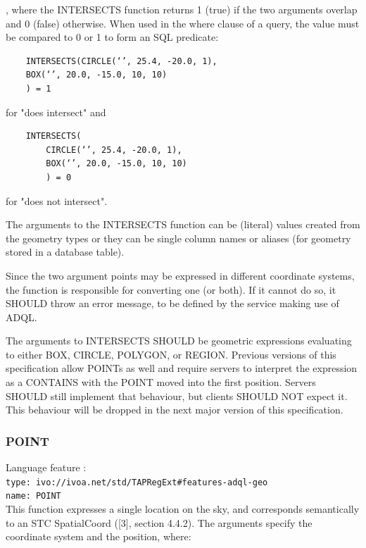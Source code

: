 \documentclass[11pt,a4paper]{ivoa}
\begin{document}
, where the INTERSECTS function returns 1 (true) if the two arguments overlap
and 0 (false) otherwise. When used in the where clause of a query, the value
must be compared to 0 or 1 to form an SQL predicate:

\begin{verbatim}
    INTERSECTS(CIRCLE(‘’, 25.4, -20.0, 1),
    BOX(‘’, 20.0, -15.0, 10, 10)
    ) = 1
\end{verbatim}

for "does intersect" and

\begin{verbatim}
    INTERSECTS(
        CIRCLE(‘’, 25.4, -20.0, 1),
        BOX(‘’, 20.0, -15.0, 10, 10)
        ) = 0
\end{verbatim}

for "does not intersect".

The arguments to the INTERSECTS function can be (literal) values created from
the geometry types or they can be single column names or aliases (for geometry
stored in a database table).

Since the two argument points may be expressed in different coordinate
systems, the function is responsible for converting one (or both). If it
cannot do so, it SHOULD throw an error message, to be defined by the service
making use of ADQL.

The arguments to INTERSECTS SHOULD be geometric expressions evaluating to
either BOX, CIRCLE, POLYGON, or REGION. Previous versions of this
specification allow POINTs as well and require servers to interpret the
expression as a CONTAINS with the POINT moved into the first position. Servers
SHOULD still implement that behaviour, but clients SHOULD NOT expect it. This
behaviour will be dropped in the next major version of this specification.

\subsubsection{POINT}
\label{sec:geom.functions.point}
{\footnotesize Language feature :}\\
{\footnotesize \verb|type: ivo://ivoa.net/std/TAPRegExt#features-adql-geo|}\\
{\footnotesize \verb|name: POINT|}\\

This function expresses a single location on the sky, and corresponds
semantically to an STC SpatialCoord ([3], section 4.4.2). The arguments
specify the coordinate system and the position, where:
\end{document}
